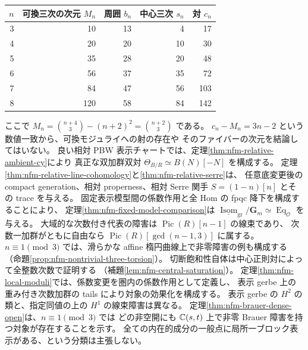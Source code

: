 \begin{center}
\begin{tabular}{r|r|r|r|r}
$n$&可換三次の次元 $M_n$&周囲 $b_n$&中心三次 $s_n$&対 $c_n$\\\hline
3&10&13&4&17\\
4&20&20&10&30\\
5&35&28&20&48\\
6&56&37&35&72\\
7&84&47&56&103\\
8&120&58&84&142
\end{tabular}
\end{center}
ここで $M_n=\binom{n+4}{3}-(n+2)^2=\binom{n+2}{3}$ である。
$c_n-M_n=3n-2$ という数値一致から、可換モジュライへの射の存在や
そのファイバーの次元を結論してはいない。
良い相対 PBW 表示チャートでは、定理\ref{thm:nfm-relative-ambient-cy}により
真正な双加群双対 $\Theta_{B/R}\simeq B(N)[-N]$ を構成する。
定理\ref{thm:nfm-relative-line-cohomology}と\ref{thm:nfm-relative-serre}は、
任意底変更後の compact generation、相対 properness、相対 Serre 関手
$S=(1-n)[n]$ とその trace を与える。
固定表示模型間の係数作用と全 Hom の fpqc 降下を構成することにより、
定理\ref{thm:nfm-fixed-model-comparison}は
$\underline{\operatorname{Isom}}_{\mathrm{gr}}/\mathbf G_m
\simeq\operatorname{Eq}_{\mathcal O}$ を与える。
大域的な次数付き代表の障害は $\operatorname{Pic}(R)[n-1]$ の線束であり、
次数一加群がともに自由なら $\operatorname{Pic}(R)[\gcd(n-1,3)]$ に属する。
$n\equiv1\pmod3$ では、滑らかな affine 楕円曲線上で非零障害の例も構成する
（命題\ref{prop:nfm-nontrivial-three-torsion}）。
切断飽和性自体は中心正則対によって全整数次数で証明する
（補題\ref{lem:nfm-central-saturation}）。
定理\ref{thm:nfm-local-moduli}では、係数変更を圏内の係数作用として定義し、
表示 gerbe 上の重み付き次数加群の tails により対象の効果化を構成する。
表示 gerbe の $H^2$ の類と、指定同値の上の $H^1$ の線束障害は異なる。
定理\ref{thm:nfm-brauer-dense-open}は、$n\equiv1\pmod3$ では
どの非空開にも $\mathbb C(s,t)$ 上で非零 Brauer 障害を持つ対象が存在することを示す。
全ての内在的成分の一般点に局所一ブロック表示がある、という分類は主張しない。

